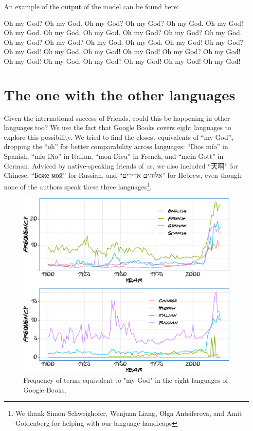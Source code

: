 \documentclass[]{article}
\begin{document}
An example of the output of the model can be found here:

{
Oh my God? Oh my God. Oh my God? Oh my God? Oh my God. Oh my God! Oh my God. Oh my God. Oh my God. Oh my God? Oh my God? Oh my God. Oh my God? Oh my God? Oh my God. Oh my God. Oh my God! Oh my God? Oh my God! Oh my God. Oh my God! Oh my God! Oh my God? Oh my God! Oh my God! Oh my God. Oh my God? Oh my God! Oh my God! Oh my God!
}

\hypertarget{the-one-with-the-other-languages}{%
\section{The one with the other languages}\label{the-one-with-the-other-languages}}

Given the international success of Friends, could this be happening in other languages too? We use the fact that Google Books covers eight languages to explore this possibility. We tried to find the closest equivalents of ``my God'', dropping the ``oh'' for better comparability across languages: ``Dios mío'' in Spanish, ``mio Dio'' in Italian, ``mon Dieu'' in French, and ``mein Gott'' in German. Adviced by native-speaking friends of us, we also included ``天啊'' for Chinese, ``Боже мой'' for Russian, and ``אלוהים אדירים'' for Hebrew, even though none of the authors speak these three languages\footnote{We thank Simon Schweighofer, Wenjuan Liang, Olga Antsiferova, and Amit Goldenberg for helping with our language handicaps}.

\begin{figure}

{\centering \includegraphics{Friends_HPS_pdf_files/figure-latex/booksplots-1} 

}

\caption{Frequency of terms equivalent to "my God" in the eight languages of Google Books.}\label{fig:booksplots}
\end{figure}
\end{document}
